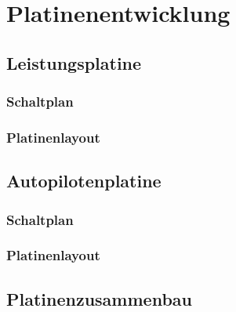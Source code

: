 \chapter{Platinenentwicklung}\label{cha:Platinenentwicklung}

\section{Leistungsplatine}

\subsection{Schaltplan}

\subsection{Platinenlayout}

\section{Autopilotenplatine}

\subsection{Schaltplan}

\subsection{Platinenlayout}

\section{Platinenzusammenbau}